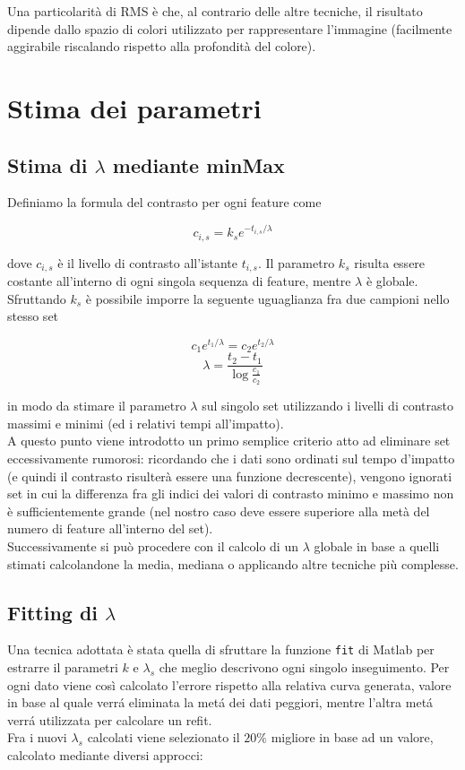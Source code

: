 \documentclass[12pt]{report}
\begin{document}
\noindent Una particolarit\`a di RMS \`e che, al contrario delle altre tecniche, il risultato dipende dallo spazio di colori utilizzato per rappresentare l'immagine (facilmente aggirabile riscalando rispetto alla profondit\`a del colore).

\section{Stima dei parametri}

\subsection{Stima di $\lambda$ mediante minMax}

\noindent Definiamo la formula del contrasto per ogni feature come

$$ c_{i,s} = k_se^{-t_{i,s}/\lambda} $$

\noindent dove $c_{i,s}$ \`e il livello di contrasto all'istante $t_{i,s}$. Il parametro $k_s$ risulta essere costante all'interno di ogni singola sequenza di feature, mentre $\lambda$ \`e globale.
Sfruttando $k_s$ \`e possibile imporre la seguente uguaglianza fra due campioni nello stesso set

$$ c_1e^{t_1/\lambda} = c_2e^{t_2/\lambda} $$
$$ \lambda = \frac{t_2-t_1}{\log\frac{c_1}{c_2}} $$

\noindent in modo da stimare il parametro $\lambda$ sul singolo set utilizzando i livelli di contrasto massimi e minimi (ed i relativi tempi all'impatto).\\
A questo punto viene introdotto un primo semplice criterio atto ad eliminare set eccessivamente rumorosi: ricordando che i dati sono ordinati sul tempo d'impatto (e quindi il contrasto risulter\`a essere una funzione decrescente), vengono ignorati set in cui la differenza fra gli indici dei valori di contrasto minimo e massimo non \`e sufficientemente grande (nel nostro caso deve essere superiore alla met\`a del numero di feature all'interno del set).\\
Successivamente si pu\`o procedere con il calcolo di un $\lambda$ globale in base a quelli stimati calcolandone la media, mediana o applicando altre tecniche pi\`u complesse.

\subsection{Fitting di $\lambda$}
\noindent Una tecnica adottata \`e stata quella di sfruttare la funzione \verb|fit| di Matlab per estrarre il parametri $k$ e $\lambda_s$ che meglio descrivono ogni singolo inseguimento. Per ogni dato viene cos\`i calcolato l'errore rispetto alla relativa curva generata, valore in base al quale verr\'a eliminata la met\'a dei dati peggiori, mentre l'altra met\'a verr\'a utilizzata per calcolare un refit.\\
Fra i nuovi $\lambda_s$ calcolati viene selezionato il $20\%$ migliore in base ad un valore, calcolato mediante diversi approcci:
\end{document}
